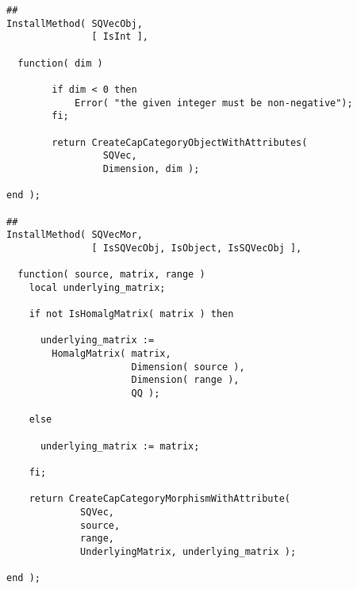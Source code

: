 \begin{small}
\begin{Verbatim}[frame=single]
##
InstallMethod( SQVecObj,
               [ IsInt ],
               
  function( dim )
        
        if dim < 0 then
            Error( "the given integer must be non-negative");
        fi;
        
        return CreateCapCategoryObjectWithAttributes(
                 SQVec,
                 Dimension, dim );
         
end );

##
InstallMethod( SQVecMor,
               [ IsSQVecObj, IsObject, IsSQVecObj ],
                  
  function( source, matrix, range )
    local underlying_matrix;

    if not IsHomalgMatrix( matrix ) then
    
      underlying_matrix := 
        HomalgMatrix( matrix,
                      Dimension( source ),
                      Dimension( range ),
                      QQ );

    else

      underlying_matrix := matrix;

    fi;
    
    return CreateCapCategoryMorphismWithAttribute(
             SQVec,
             source,
             range,
             UnderlyingMatrix, underlying_matrix );
    
end );
\end{Verbatim}
\end{small}